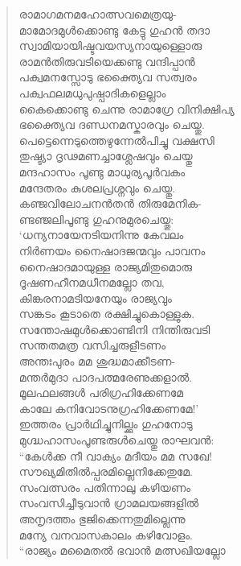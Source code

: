 \begin{verse}
രാമാഗമനമഹോത്സവമെത്രയു-\\
മാമോദമുള്‍ക്കൊണ്ടു കേട്ടു ഗുഹന്‍ തദാ\\
സ്വാമിയായിഷ്ടവയസ്യനായുള്ളൊരു\\
രാമന്‍തിരുവടിയെക്കണ്ടു വന്ദിപ്പാന്‍\\
പക്വമനസ്സോടു ഭക്ത്യൈവ സത്വരം\\
പക്വഫലമധുപുഷ്പാദികളെല്ലാം\\
കൈക്കൊണ്ടു ചെന്നു രാമാഗ്രേ വിനിക്ഷിപ്യ\\
ഭക്ത്യൈവ ദണ്ഡനമസ്കാരവും ചെയ്തു.\\
പെട്ടെന്നെടുത്തെഴുന്നേല്‍പിച്ചു വക്ഷസി\\
തുഷ്ട്യാ ദൃഢമണച്ചാശ്ലേഷവും ചെയ്തു\\
മന്ദഹാസം പൂണ്ടു മാധുര്യപൂര്‍വകം\\
മന്ദേതരം കുശലപ്രശ്നവും ചെയ്തു.\\
കഞ്ജവിലോചനന്‍തന്‍ തിരുമേനിക-\\
ണ്ടഞ്ജലിപൂണ്ടു ഗുഹനുമുരചെയ്തു:\\
‘ധന്യനായേനടിയനിന്നു കേവലം\\
നിര്‍ണയം നൈഷാദജന്മവും പാവനം\\
നൈഷാദമായുള്ള രാജ്യമിതുമൊരു\\
ദൂഷണഹീനമധീനമല്ലോ തവ,\\
കിങ്കരനാമടിയനേയും രാജ്യവും\\
സങ്കടം കൂടാതെ രക്ഷിച്ചുകൊള്ളുക.\\
സന്തോഷമുള്‍ക്കൊണ്ടിനി നിന്തിരുവടി\\
സന്തതമത്ര വസിച്ചരുളീടണം\\
അന്തഃപുരം മമ ശുദ്ധമാക്കീടണ-\\
മന്തര്‍മുദാ പാദപത്മരേണുക്കളാല്‍.\\
മൂലഫലങ്ങള്‍ പരിഗ്രഹിക്കേണമേ\\
കാലേ കനിവോടനുഗ്രഹിക്കേണമേ!’\\
ഇത്തരം പ്രാര്‍ഥിച്ചുനില്ക്കും ഗുഹനോടു\\
മുഗ്ദ്ധഹാസംപൂണ്ടരുള്‍ചെയ്തു രാഘവന്‍:\\
“കേള്‍ക്ക നീ വാക്യം മദീയം മമ സഖേ!\\
സൗഖ്യമിതില്‍പ്പരമില്ലെനിക്കേതുമേ.\\
സംവത്സരം പതിന്നാലു കഴിയണം\\
സംവസിച്ചീടുവാന്‍ ഗ്രാമലയങ്ങളില്‍\\
അനൃദത്തം ഭുജിക്കെന്നതുമില്ലെന്നു\\
മന്യേ വനവാസകാലം കഴിവോളം.\\
“രാജ്യം മമൈതല്‍ ഭവാന്‍ മത്സഖിയല്ലോ\\

\end{verse}
